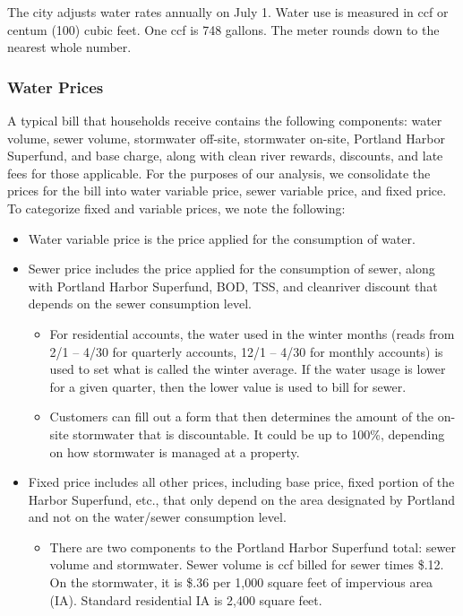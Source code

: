 \documentclass[11pt]{article}
\begin{document}
The city adjusts water rates annually on July 1. Water use is measured in ccf or centum (100) cubic feet. One ccf is 748 gallons. The meter rounds down to the nearest whole number.

\subsubsection*{Water Prices}

A typical bill that households receive contains the following components: water volume, sewer volume, stormwater off-site, stormwater on-site, Portland Harbor Superfund, and base charge, along with clean river rewards, discounts, and late fees for those applicable. For the purposes of our analysis, we consolidate the prices for the bill into water variable price, sewer variable price, and fixed price. To categorize fixed and variable prices, we note the following:

\begin{itemize}
	\item Water variable price is the price applied for the consumption of water.
	\item Sewer price includes the price applied for the consumption of sewer, along with Portland Harbor Superfund, BOD, TSS, and cleanriver discount that depends on the sewer consumption level.
	\begin{itemize}
		\item For residential accounts, the water used in the winter months (reads from 2/1 – 4/30 for quarterly accounts, 12/1 – 4/30 for monthly accounts) is used to set what is called the winter average. If the water usage is lower for a given quarter, then the lower value is used to bill for sewer.
		\item Customers can fill out a form that then determines the amount of the on-site stormwater that is discountable. It could be up to 100\%, depending on how stormwater is managed at a property.
	\end{itemize}
	\item Fixed price includes all other prices, including base price, fixed portion of the Harbor Superfund, etc., that only depend on the area designated by Portland and not on the water/sewer consumption level.
	\begin{itemize}
		\item There are two components to the Portland Harbor Superfund total: sewer volume and stormwater. Sewer volume is ccf billed for sewer times \$.12. On the stormwater, it is \$.36 per 1,000 square feet of impervious area (IA). Standard residential IA is 2,400 square feet.
	\end{itemize}
\end{itemize}
\end{document}
